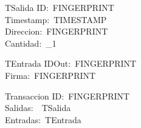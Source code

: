 \begin{schema}{TSalida}
ID:~FINGERPRINT\\
Timestamp:~TIMESTAMP\\
Direccion:~FINGERPRINT\\
Cantidad:~\nat_1\\
\end{schema}
\begin{schema}{TEntrada}
IDOut:~FINGERPRINT\\
Firma:~FINGERPRINT\\
\end{schema}
\begin{schema}{Transaccion}
ID:~FINGERPRINT\\
Salidas:~\power~TSalida\\
Entradas:~\power TEntrada\\
\end{schema}

